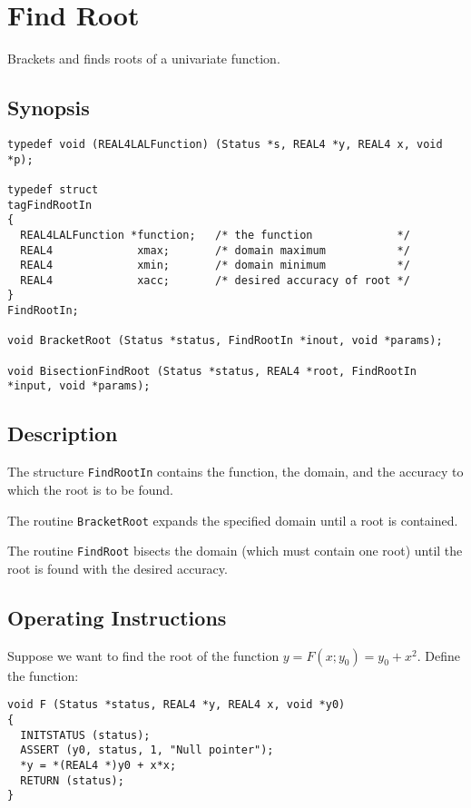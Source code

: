 \documentclass{article}
\begin{document}
\section{Find Root}

Brackets and finds roots of a univariate function.

\subsection{Synopsis}
\begin{verbatim}
typedef void (REAL4LALFunction) (Status *s, REAL4 *y, REAL4 x, void *p);

typedef struct
tagFindRootIn
{
  REAL4LALFunction *function;   /* the function             */
  REAL4             xmax;       /* domain maximum           */
  REAL4             xmin;       /* domain minimum           */
  REAL4             xacc;       /* desired accuracy of root */
}
FindRootIn;

void BracketRoot (Status *status, FindRootIn *inout, void *params);

void BisectionFindRoot (Status *status, REAL4 *root, FindRootIn *input, void *params);
\end{verbatim}

\subsection{Description}

The structure \verb+FindRootIn+ contains the function, the domain, and the
accuracy to which the root is to be found.

The routine \verb+BracketRoot+ expands the specified domain until a root is
contained.

The routine \verb+FindRoot+ bisects the domain (which must contain one root)
until the root is found with the desired accuracy.

\subsection{Operating Instructions}

Suppose we want to find the root of the function $y = F(x;y_0) = y_0 + x^2$.
Define the function:
\begin{verbatim}
void F (Status *status, REAL4 *y, REAL4 x, void *y0)
{
  INITSTATUS (status);
  ASSERT (y0, status, 1, "Null pointer");
  *y = *(REAL4 *)y0 + x*x;
  RETURN (status);
}
\end{verbatim}
\end{document}
